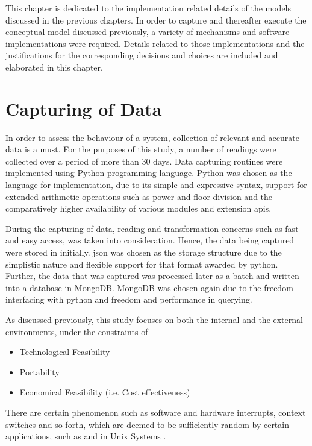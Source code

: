 This chapter is dedicated to the implementation related details of the models discussed in the previous chapters. In order to capture and thereafter execute the conceptual model discussed previously, a variety of mechanisms and software implementations were required. Details related to those implementations and the justifications for the corresponding decisions and choices are included and elaborated in this chapter.

\section{Capturing of Data}

In order to assess the behaviour of a system, collection of relevant and accurate data is a must. For the purposes of this study, a number of readings were collected over a period of more than 30 days. Data capturing routines were implemented using Python programming language. Python was chosen as the language for implementation, due to its simple and expressive syntax, support for extended arithmetic operations such as power and floor division and the comparatively higher availability of various modules and extension \acrfull{api}s.

During the capturing of data, reading and transformation concerns such as fast and easy access, was taken into consideration. Hence, the data being captured were stored in  initially. \acrfull{json} was chosen as the storage structure due to the simplistic nature and flexible support for that format awarded by python. Further, the data that was captured was processed later as a batch and written into a database in MongoDB. MongoDB was chosen again due to the freedom interfacing with python and freedom and performance in querying.

As discussed previously, this study focuses on both the internal and the external environments, under the constraints of

\begin{itemize}
    \item Technological Feasibility
    \item Portability
    \item Economical Feasibility (i.e. Cost effectiveness)
\end{itemize}

There are certain phenomenon such as software and hardware interrupts, context switches and so forth, which are deemed to be sufficiently random by certain applications, such as  and  in Unix Systems \cite{web_linux_rand_urand}.

